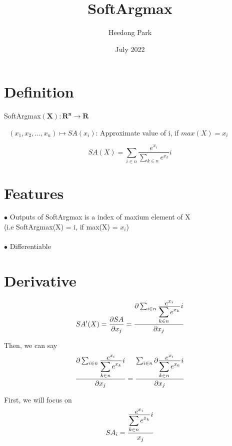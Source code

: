 \documentclass{article}
\title{SoftArgmax}
\author{Heedong Park}
\date{July 2022}
\begin{document}
\maketitle

\section{Definition}

SoftArgmax$(\mathbf{X}) : \mathbf{R^n} \longrightarrow \mathbf{R}$ 

\quad \,\, $({x_1},{x_2},...,{x_n}) \longmapsto SA(x_i)$: Approximate value of i, if $max(X) = x_i$


\begin{equation} 
SA(X)=\sum_{i \in n} {\frac {\displaystyle e^{x_i}} 
{\displaystyle \sum_{k \in n} e^{x_k}}} i 
\end{equation}

\section{Features}
$\bullet$ Outputs of SoftArgmax is a index of maxium element of X\\(i.e SoftArgmax(X) = i, if max(X) = $x_i$)\\\\
$\bullet$ Differentiable




\section{Derivative}
\begin{equation}
SA^\prime(X)={\partial SA\over \partial x_j}={\partial \sum_{i \in n} {\frac {\displaystyle e^{x_i}}
{\displaystyle \sum_{k \in n} e^{x_k}}} i \over \partial x_j}    
\end{equation}

Then, we can say \begin{equation}
{\partial \sum_{i \in n} {\frac {\displaystyle e^{x_i}}
{\displaystyle \sum_{k \in n} e^{x_k}}} i \over \partial x_j} =
{\sum_{i \in n} \partial {\frac {\displaystyle e^{x_i}} {\displaystyle \sum_{k \in n} e^{x_k}}} i \over \partial x_j}
\end{equation}

First, we will focus on \begin{equation}
SA_i = {{\frac {\displaystyle e^{x_i}} {\displaystyle \sum_{k \in n} e^{x_k}}} i \over x_j}
\end{equation}
\end{document}
